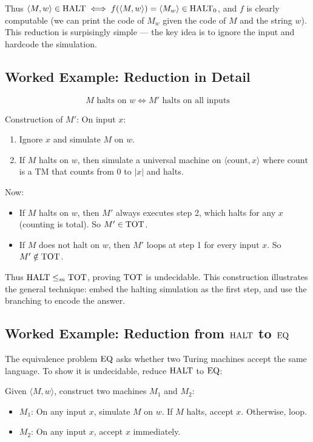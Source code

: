 Thus $\langle M, w \rangle \in \text{HALT} \iff f(\langle M, w \rangle) = \langle M_w \rangle \in \text{HALT}_0$, and $f$ is clearly computable (we can print the code of $M_w$ given the code of $M$ and the string $w$). This reduction is surpisingly simple — the key idea is to ignore the input and hardcode the simulation.

\subsection*{Worked Example: Reduction in Detail}

\[
M \text{ halts on } w \iff M' \text{ halts on all inputs}
\]

Construction of $M'$: On input $x$:
\begin{enumerate}
\item Ignore $x$ and simulate $M$ on $w$.
\item If $M$ halts on $w$, then simulate a universal machine on $\langle \text{count}, x \rangle$ where $\text{count}$ is a TM that counts from $0$ to $|x|$ and halts.
\end{enumerate}

Now:
\begin{itemize}
\item If $M$ halts on $w$, then $M'$ always executes step 2, which halts for any $x$ (counting is total). So $M' \in \text{TOT}$.
\item If $M$ does not halt on $w$, then $M'$ loops at step 1 for every input $x$. So $M' \notin \text{TOT}$.
\end{itemize}

Thus $\text{HALT} \le_m \text{TOT}$, proving $\text{TOT}$ is undecidable. This construction illustrates the general technique: embed the halting simulation as the first step, and use the branching to encode the answer.

\subsection*{Worked Example: Reduction from $\text{HALT}$ to $\text{EQ}$}

The equivalence problem $\text{EQ}$ asks whether two Turing machines accept the same language. To show it is undecidable, reduce $\text{HALT}$ to $\text{EQ}$:

Given $\langle M, w \rangle$, construct two machines $M_1$ and $M_2$:
\begin{itemize}
\item $M_1$: On any input $x$, simulate $M$ on $w$. If $M$ halts, accept $x$. Otherwise, loop.
\item $M_2$: On any input $x$, accept $x$ immediately.
\end{itemize}

